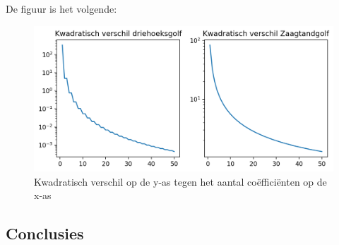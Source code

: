 \documentclass[12pt, dutch, a4paper]{article}
\theoremstyle{definition}
\begin{document}
\begin{enumerate}[(a)., wide]
  De figuur is het volgende:
  \begin{figure}[h]
    \includegraphics[width=\textwidth]{images/tot_kwadratisch_verschil.png}
    \caption{Kwadratisch verschil op de y-as tegen het aantal coëfficiënten op de x-as}
  \end{figure}
\end{enumerate}
\subsection*{Conclusies}
\end{document}
